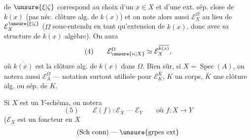 de $\unsure{\xi|\zeta}$ correspond au choix d'un $x\in X$ et d'une ext. sép. close  \inserted{$\Omega$} de $k(x)$ (pas néc.  clôture alg. de $k(x)$) et on note alors aussi $\mathcal E_X^\Omega$ au lieu de $\mathcal E_X^{\unsure{\xi|\zeta}}$ ($\Omega$ sous-entendu en tant qu'extension de $k(x)$, donc avec sa structure de $k(x)$ algèbre). On aura 
\[
(4)\qquad \mathcal E_{\unsure{\alpha|X}}^\Omega\simeq\mathcal E_X^{\overline{k(x)}},
\]
où $\overline{k(x)}$ est la clôture alg. de $k(x)$ dans $\Omega$. Bien sûr, si $X=\operatorname{Spec}(A)$, on notera aussi $\mathcal E_A^\Omega$ --- notation surtout utilisée pour $\mathcal E_K^{\bar K}$, $K$ un corps, $\bar K$ une clôture alg. ou sép. de $K$.

Si $X$ est un $Y$-schéma,  on notera
\[
(5)\qquad \mathcal E(f):\mathcal E_X\mathrel{\text{---}}\mathcal E_Y\qquad\text{où }f:X\longrightarrow Y
\]
($\mathcal E_X$ est un foncteur en $X$
\[
(\text{Sch conn})\mathrel{\text{---}}\unsure{\text{grpes ext}}
\]
